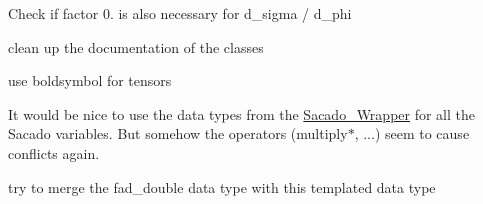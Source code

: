 
\begin{DoxyRefList}
\item[\label{todo__todo000001}%
\hypertarget{todo__todo000001}{}%
page \hyperlink{index}{Trilinos\+:\+:Sacado example documentation} ]Check if factor 0. is also necessary for d\+\_\+sigma / d\+\_\+phi

clean up the documentation of the classes

use boldsymbol for tensors

It would be nice to use the data types from the \hyperlink{namespaceSacado__Wrapper}{Sacado\+\_\+\+Wrapper} for all the Sacado variables. But somehow the operators (multiply$\ast$, ...) seem to cause conflicts again.

try to merge the fad\+\_\+double data type with this templated data type 
\end{DoxyRefList}